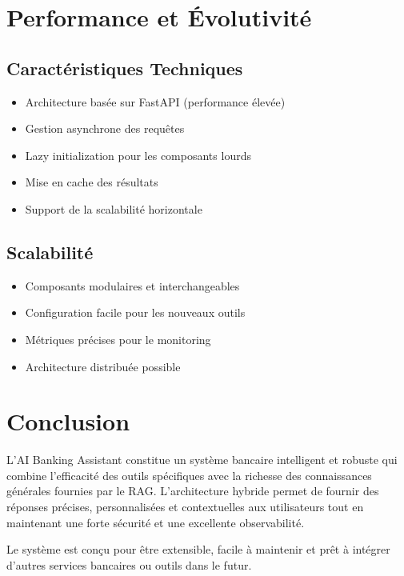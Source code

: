 \documentclass[12pt,a4paper]{article}
\begin{document}
\section*{Performance et Évolutivité}

\subsection*{Caractéristiques Techniques}
\begin{itemize}
    \item Architecture basée sur FastAPI (performance élevée)
    \item Gestion asynchrone des requêtes
    \item Lazy initialization pour les composants lourds
    \item Mise en cache des résultats
    \item Support de la scalabilité horizontale
\end{itemize}

\subsection*{Scalabilité}
\begin{itemize}
    \item Composants modulaires et interchangeables
    \item Configuration facile pour les nouveaux outils
    \item Métriques précises pour le monitoring
    \item Architecture distribuée possible
\end{itemize}

\section*{Conclusion}

L'AI Banking Assistant constitue un système bancaire intelligent et robuste qui combine l'efficacité des outils spécifiques avec la richesse des connaissances générales fournies par le RAG. L'architecture hybride permet de fournir des réponses précises, personnalisées et contextuelles aux utilisateurs tout en maintenant une forte sécurité et une excellente observabilité.

Le système est conçu pour être extensible, facile à maintenir et prêt à intégrer d'autres services bancaires ou outils dans le futur.
\end{document}
